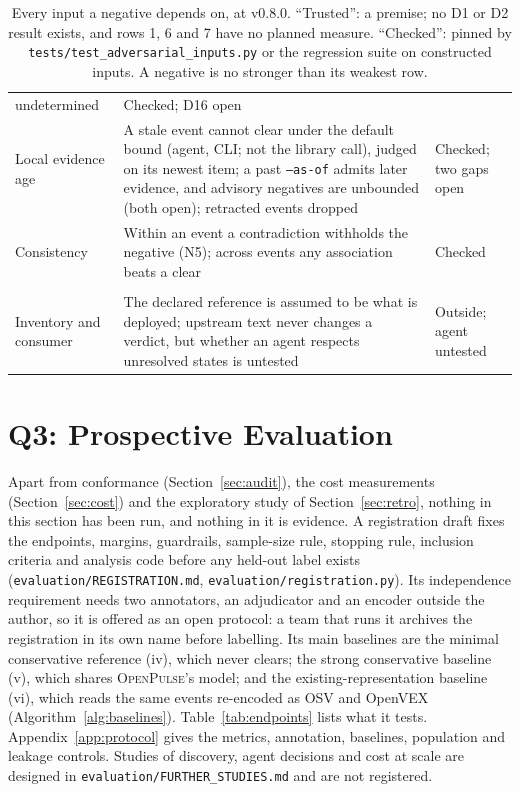 \documentclass[11pt,a4paper]{article}
\newcommand{\op}{\textsc{OpenPulse}}
\newcommand{\code}[1]{\texttt{#1}}
\newcommand{\release}{v0.8.0}
\begin{document}
\begin{table}[t]
\begin{tabularx}{\linewidth}{@{}>{\raggedright\arraybackslash}p{2.5cm} >{\raggedright\arraybackslash}X >{\raggedright\arraybackslash}p{2.2cm}@{}}
  undetermined & Checked; D16 open \\
9 Local evidence age & A stale event cannot clear under the default
  bound (agent, CLI; not the library call), judged on its newest item;
  a past \code{--as-of} admits later evidence, and advisory negatives
  are unbounded (both open); retracted events dropped & Checked; two
  gaps open \\
10 Consistency & Within an event a contradiction withholds the negative
  (N5); across events any association beats a clear & Checked \\
\midrule
\multicolumn{3}{@{}l}{\emph{Outside \op{}}} \\
11 Inventory and consumer & The declared reference is assumed to be what
  is deployed; upstream text never changes a verdict, but whether an
  agent respects unresolved states is untested & Outside; agent
  untested \\
\bottomrule
\end{tabularx}
\caption{Every input a negative depends on, at \release{}.
``Trusted'': a premise; no D1 or D2 result exists, and rows 1, 6 and 7
have no planned measure. ``Checked'': pinned by
\code{tests/test\_adversarial\_inputs.py} or the regression suite on
constructed inputs. A negative is no stronger than its weakest row.}
\label{tab:adversary}
\end{table}

\section{Q3: Prospective Evaluation}
\label{sec:evalplan}

Apart from conformance (Section~\ref{sec:audit}), the cost measurements
(Section~\ref{sec:cost}) and the exploratory study of
Section~\ref{sec:retro}, nothing in this section has been run, and
nothing in it is evidence. A registration draft fixes the endpoints,
margins, guardrails, sample-size rule, stopping rule, inclusion
criteria and analysis code before any held-out label exists
(\code{evaluation/REGISTRATION.md}, \code{evaluation/registration.py}).
Its independence requirement needs two annotators, an adjudicator and
an encoder outside the author, so it is offered as an open protocol: a
team that runs it archives the registration in its own name before
labelling. Its main baselines are the minimal conservative reference
(iv), which never clears; the strong conservative baseline (v), which
shares \op{}'s model; and the existing-representation baseline (vi),
which reads the same events re-encoded as OSV and OpenVEX
(Algorithm~\ref{alg:baselines}). Table~\ref{tab:endpoints} lists what
it tests.
Appendix~\ref{app:protocol} gives the metrics, annotation, baselines,
population and leakage controls. Studies of discovery, agent decisions
and cost at scale are designed in \code{evaluation/FURTHER\_STUDIES.md}
and are not registered.
\end{document}
